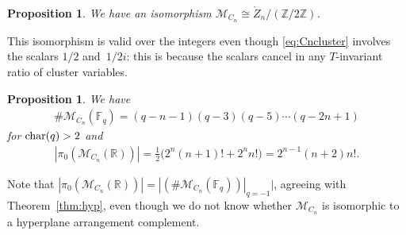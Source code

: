 \documentclass[10pt,a4paper]{amsart}
\def\R{{\mathbb R}}
\def\Z{{\mathbb Z}}
\def\F{{\mathbb F}}
\def\Zo{{\mathring{Z}}}
\def\M{{\mathcal{M}}}
\numberwithin{equation}{section}
\newtheorem{Proposition}[Theorem]{Proposition}
\begin{document}
\begin{Proposition}\label{prop:Cnconfig}
We have an isomorphism $\M_{C_n} \cong \Zo_n/(\Z/2\Z)$.
\end{Proposition}

This isomorphism is valid over the integers even though \eqref{eq:Cncluster} involves the scalars $1/2$ and~$1/2i$: this is because the scalars cancel in any $T$-invariant ratio of cluster variables.

\begin{Proposition}
We have
\begin{gather*}
\# \M_{C_n}(\F_q) = (q-n-1)(q-3)(q-5) \cdots (q-2n+1)
\end{gather*}
for ${\rm char}(q) > 2$ and
\begin{gather*}
|\pi_0( \M_{C_n}(\R))| = \frac{1}{2}\big( 2^n (n+1)! + 2^n n!\big) = 2^{n-1}(n+2) n!.
\end{gather*}
\end{Proposition}
Note that $|\pi_0( \M_{C_n}(\R))| = |(\# \M_{C_n}(\F_q))|_{q=-1}|$, agreeing with Theorem~\ref{thm:hyp}, even though we do not know whether $\M_{C_n}$ is isomorphic to a hyperplane arrangement complement.
\end{document}
